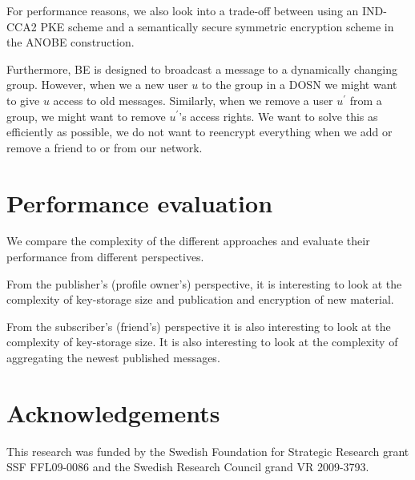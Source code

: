 For performance reasons, we also look into a trade-off between using an 
IND-CCA2 \ac{PKE} scheme and a semantically secure symmetric encryption scheme 
in the \ac{ANOBE} construction.

Furthermore, \ac{BE} is designed to broadcast a message to a dynamically 
changing group.
However, when we a new user \(u\) to the group in a \ac{DOSN} we might want to 
give \(u\) access to old messages.
Similarly, when we remove a user \(u^\prime\) from a group, we might want to 
remove \(u^\prime\)'s access rights.
We want to solve this as efficiently as possible, we do not want to reencrypt 
everything when we add or remove a friend to or from our network.



\section{Performance evaluation}

We compare the complexity of the different approaches and evaluate their 
performance from different perspectives.

From the publisher's (profile owner's) perspective, it is interesting to look 
at the complexity of key-storage size and publication and encryption of new 
material.

From the subscriber's (friend's) perspective it is also interesting to look at 
the complexity of key-storage size.
It is also interesting to look at the complexity of aggregating the newest 
published messages.


\section*{Acknowledgements}

This research was funded by the Swedish Foundation for Strategic Research grant 
SSF FFL09-0086 and the Swedish Research Council grand VR 2009-3793.


\printbibliography
